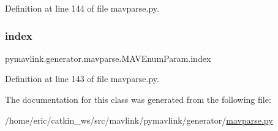 Definition at line 144 of file mavparse.\+py.

\mbox{\label{classpymavlink_1_1generator_1_1mavparse_1_1MAVEnumParam_aa2db535fa7a3fd9f682b56a65cf09e9e}} 
\subsubsection{\texorpdfstring{index}{index}}
{\footnotesize\ttfamily pymavlink.\+generator.\+mavparse.\+M\+A\+V\+Enum\+Param.\+index}



Definition at line 143 of file mavparse.\+py.



The documentation for this class was generated from the following file\+:\begin{DoxyCompactItemize}
\item 
/home/eric/catkin\+\_\+ws/src/mavlink/pymavlink/generator/\mbox{\hyperlink{mavparse_8py}{mavparse.\+py}}\end{DoxyCompactItemize}
